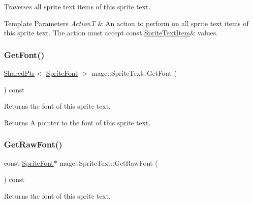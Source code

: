Traverses all sprite text items of this sprite text.


\begin{DoxyTemplParams}{Template Parameters}
{\em ActionT} & An action to perform on all sprite text items of this sprite text. The action must accept {\ttfamily const} {\ttfamily \hyperlink{structmage_1_1_sprite_text_item}{Sprite\+Text\+Item}\&} values. \\
\hline
\end{DoxyTemplParams}
\hypertarget{classmage_1_1_sprite_text_a1c80933525f87fe4dced9479c1b79764}{}\label{classmage_1_1_sprite_text_a1c80933525f87fe4dced9479c1b79764} 
\subsubsection{\texorpdfstring{Get\+Font()}{GetFont()}}
{\footnotesize\ttfamily \hyperlink{namespacemage_a1e01ae66713838a7a67d30e44c67703e}{Shared\+Ptr}$<$ \hyperlink{classmage_1_1_sprite_font}{Sprite\+Font} $>$ mage\+::\+Sprite\+Text\+::\+Get\+Font (\begin{DoxyParamCaption}{ }\end{DoxyParamCaption}) const}

Returns the font of this sprite text.

\begin{DoxyReturn}{Returns}
A pointer to the font of this sprite text. 
\end{DoxyReturn}
\hypertarget{classmage_1_1_sprite_text_ab67ba17af1b19766343d04f10853c8d6}{}\label{classmage_1_1_sprite_text_ab67ba17af1b19766343d04f10853c8d6} 
\subsubsection{\texorpdfstring{Get\+Raw\+Font()}{GetRawFont()}}
{\footnotesize\ttfamily const \hyperlink{classmage_1_1_sprite_font}{Sprite\+Font}$\ast$ mage\+::\+Sprite\+Text\+::\+Get\+Raw\+Font (\begin{DoxyParamCaption}{ }\end{DoxyParamCaption}) const\hspace{0.3cm}{\ttfamily [protected]}}

Returns the font of this sprite text.

